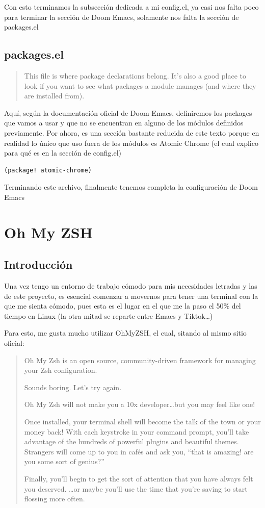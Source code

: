 \documentclass[11pt]{article}
\begin{document}
Con esto terminamos la subsección dedicada a mi config.el, ya casi nos falta poco para terminar la sección de Doom Emacs, solamente nos falta la sección de packages.el
\subsection{packages.el}
\label{sec:org9c9276f}

\begin{quote}
This file is where package declarations belong. It’s also a good place to look if you want to see what packages a module manages (and where they are installed from).
\end{quote}

Aquí, según la documentación oficial de Doom Emacs, definiremos los packages que vamos a usar y que no se encuentran en alguno de los módulos definidos previamente. Por ahora, es una sección bastante reducida de este texto porque en realidad lo único que uso fuera de los módulos es Atomic Chrome (el cual explico para qué es en la sección de config.el)

\begin{verbatim}
(package! atomic-chrome)
\end{verbatim}


Terminando este archivo, finalmente tenemos completa la configuración de Doom Emacs
\section{Oh My ZSH}
\label{sec:orgf5ea616}

\subsection{Introducción}
\label{sec:org8d2c1f4}

Una vez tengo un entorno de trabajo cómodo para mis necesidades letradas y las de este proyecto, es esencial comenzar a movernos para tener una terminal con la que me sienta cómodo, pues esta es el lugar en el que me la paso el 50\% del tiempo en Linux (la otra mitad se reparte entre Emacs y Tiktok\ldots{})

Para esto, me gusta mucho utilizar OhMyZSH, el cual, sitando al mismo sitio oficial:

\begin{quote}
Oh My Zsh is an open source, community-driven framework for managing your Zsh configuration.

Sounds boring. Let's try again.

Oh My Zsh will not make you a 10x developer\ldots{}but you may feel like one!

Once installed, your terminal shell will become the talk of the town or your money back! With each keystroke in your command prompt, you'll take advantage of the hundreds of powerful plugins and beautiful themes. Strangers will come up to you in cafés and ask you, ``that is amazing! are you some sort of genius?''

Finally, you'll begin to get the sort of attention that you have always felt you deserved. \ldots{}or maybe you'll use the time that you're saving to start flossing more often. 😬
\end{quote}
\end{document}
